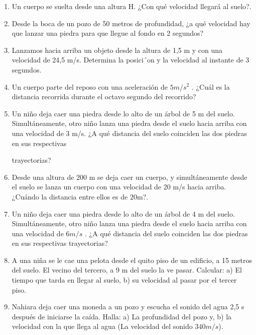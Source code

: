 \begin{enumerate}
\item Un cuerpo se suelta desde una altura H. ¿Con qué velocidad llegará al suelo?.

\item Desde la boca de un pozo de 50 metros de profundidad, ¿a qué velocidad hay que lanzar una
 piedra para que llegue al fondo 
en 2 segundos?

\item Lanzamos hacia arriba un objeto desde la altura de 1,5 m y con una velocidad de 24,5 m/s.
 Determina la posici´on y la 
velocidad al instante de 3 segundos.


\item  Un cuerpo parte del reposo con una aceleración de $5 m/s^2$
.
 ¿Cuál es la distancia recorrida durante el octavo segundo 
del recorrido?

\item  Un niño deja caer una piedra desde lo alto de un árbol de 5
 m del suelo. Simultáneamente, otro niño lanza una piedra 
desde el suelo hacia arriba con una
 velocidad de 3 m/s. ¿A qué distancia del suelo coinciden las dos piedras en sus respectivas

trayectorias?

\item  Desde una altura de 200
 m se deja caer un cuerpo, y simultáneamente desde el suelo se lanza un cuerpo con una
 velocidad 
de 20 m/s hacia arriba. ¿Cuándo la distancia entre ellos es de 20m?.


\item Un niño deja caer una piedra desde lo alto de un árbol de 4 m del suelo. Simultáneamente,
 otro niño lanza una piedra desde 
el suelo hacia arriba con una velocidad de $6 m/s$
. ¿A qué distancia del
 suelo coinciden las dos piedras en sus respectivas 
trayectorias?

\item A una niña se le cae una pelota desde el quito piso de un edificio, a 15 metros del suelo.
 El vecino del tercero, a 9 m 
del suelo la ve pasar. Calcular: a) El tiempo que tarda en llegar al suelo, b) su
 velocidad al pasar por el tercer piso.


\item Nahiara deja caer una moneda a un pozo y escucha el sonido del agua 2,5 s después de
 iniciarse la caída. Halla: a) La 
profundidad del pozo y, b) la velocidad con la que llega al agua (La velocidad del sonido $340 m/s$).

\end{enumerate}
